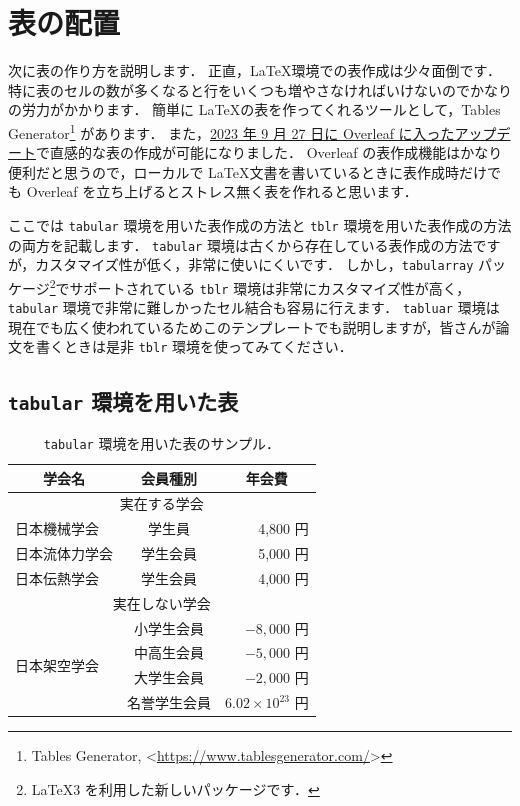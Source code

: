 \section{表の配置}
\label{sec:table}

次に表の作り方を説明します．
正直，\LaTeX 環境での表作成は少々面倒です．
特に表のセルの数が多くなると行をいくつも増やさなければいけないのでかなりの労力がかかります．
簡単に \LaTeX の表を作ってくれるツールとして，Tables Generator\footnote{Tables Generator, \textless\url{https://www.tablesgenerator.com/}\textgreater} があります．
また，\href{https://www.overleaf.com/blog/major-feature-news-add-and-edit-tables-without-writing-code}{2023 年 9 月 27 日に Overleaf に入ったアップデート}で直感的な表の作成が可能になりました．
Overleaf の表作成機能はかなり便利だと思うので，ローカルで \LaTeX 文書を書いているときに表作成時だけでも Overleaf を立ち上げるとストレス無く表を作れると思います．

ここでは \verb|tabular| 環境を用いた表作成の方法と \verb|tblr| 環境を用いた表作成の方法の両方を記載します．
\verb|tabular| 環境は古くから存在している表作成の方法ですが，カスタマイズ性が低く，非常に使いにくいです．
しかし，\verb|tabularray| パッケージ\footnote{\LaTeX3 を利用した新しいパッケージです．}でサポートされている \verb|tblr| 環境は非常にカスタマイズ性が高く，\verb|tabular| 環境で非常に難しかったセル結合も容易に行えます．
\verb|tabluar| 環境は現在でも広く使われているためこのテンプレートでも説明しますが，皆さんが論文を書くときは是非 \verb|tblr| 環境を使ってみてください．

\subsection{\texttt{tabular} 環境を用いた表}
\label{ssec:tabular}

\begin{table}[tp]
    \centering
    \caption{\texttt{tabular} 環境を用いた表のサンプル．}
    \label{table:tabular}
    \begin{tabular}{l|c|r} \hline\hline
        \multicolumn{1}{c|}{学会名}  & 会員種別  & \multicolumn{1}{c}{年会費} \\ \hline
        \multicolumn{3}{c}{実在する学会} \\ \hline
        日本機械学会    & 学生員    & 4,800 円 \\ \hline
        日本流体力学会  & 学生会員  & 5,000 円 \\ \hline
        日本伝熱学会    & 学生会員  & 4,000 円 \\ \hline
        \multicolumn{3}{c}{実在しない学会} \\ \hline
        \multirow{4}{*}{日本架空学会}& 小学生会員  & $-8,000$ 円 \\ \cline{2-3}
        & 中高生会員  & $-5,000$ 円 \\ \cline{2-3}
        & 大学生会員  & $-2,000$ 円 \\ \cline{2-3}
        & 名誉学生会員  & $6.02 \times 10^{23}$ 円 \\ \hline
    \end{tabular}
\end{table}

